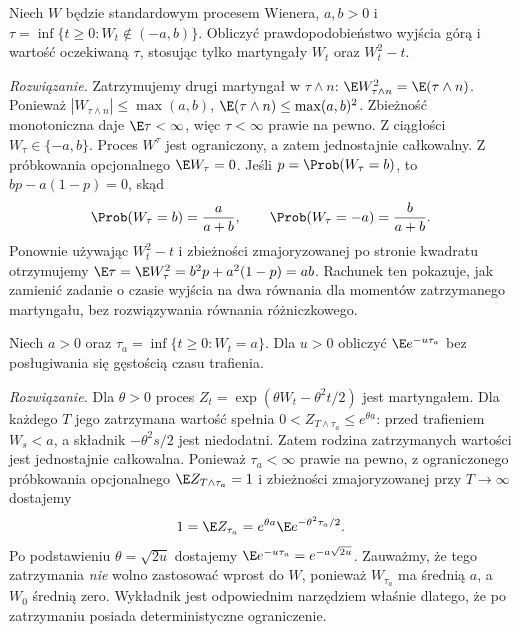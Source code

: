 \begin{zadanie}
Niech $W$ będzie standardowym procesem Wienera,
$a,b>0$ i
$\tau=\inf\{t\ge0:W_t\notin(-a,b)\}$.
Obliczyć prawdopodobieństwo wyjścia górą i wartość
oczekiwaną $\tau$, stosując tylko martyngały
$W_t$ oraz $W_t^2-t$.

\emph{Rozwiązanie.} Zatrzymujemy drugi martyngał w
$\tau\wedge n$:
$\E W_{\tau\wedge n}^2=\E(\tau\wedge n)$.
Ponieważ $|W_{\tau\wedge n}|\le\max(a,b)$,
$\E(\tau\wedge n)\le\max(a,b)^2$.
Zbieżność monotoniczna daje $\E\tau<\infty$, więc
$\tau<\infty$ prawie na pewno. Z ciągłości
$W_\tau\in\{-a,b\}$.
Proces $W^\tau$ jest ograniczony, a zatem
jednostajnie całkowalny. Z próbkowania opcjonalnego
$\E W_\tau=0$. Jeśli $p=\Prob(W_\tau=b)$, to
$bp-a(1-p)=0$, skąd
\[
\Prob(W_\tau=b)=\frac{a}{a+b},\qquad
\Prob(W_\tau=-a)=\frac{b}{a+b}.
\]
Ponownie używając $W_t^2-t$ i zbieżności zmajoryzowanej
po stronie kwadratu otrzymujemy
$\E\tau=\E W_\tau^2=b^2p+a^2(1-p)=ab$.
Rachunek ten pokazuje, jak zamienić zadanie o czasie
wyjścia na dwa równania dla momentów zatrzymanego
martyngału, bez rozwiązywania równania różniczkowego.
\end{zadanie}

\begin{zadanie}
Niech $a>0$ oraz
$\tau_a=\inf\{t\ge0:W_t=a\}$. Dla $u>0$
obliczyć $\E e^{-u\tau_a}$ bez posługiwania się
gęstością czasu trafienia.

\emph{Rozwiązanie.} Dla $\theta>0$ proces
$Z_t=\exp(\theta W_t-\theta^2t/2)$ jest
martyngałem. Dla każdego $T$ jego zatrzymana
wartość spełnia $0<Z_{T\wedge\tau_a}\le e^{\theta a}$:
przed trafieniem $W_s<a$, a składnik
$-\theta^2s/2$ jest niedodatni. Zatem rodzina
zatrzymanych wartości jest jednostajnie całkowalna.
Ponieważ $\tau_a<\infty$ prawie na pewno,
z ograniczonego próbkowania opcjonalnego
$\E Z_{T\wedge\tau_a}=1$ i zbieżności zmajoryzowanej
przy $T\to\infty$ dostajemy
\[
1=\E Z_{\tau_a}
=e^{\theta a}\E e^{-\theta^2\tau_a/2}.
\]
Po podstawieniu $\theta=\sqrt{2u}$ dostajemy
$\E e^{-u\tau_a}=e^{-a\sqrt{2u}}$.
Zauważmy, że tego zatrzymania \emph{nie} wolno
zastosować wprost do $W$, ponieważ $W_{\tau_a}$
ma średnią $a$, a $W_0$ średnią zero. Wykładnik
jest odpowiednim narzędziem właśnie dlatego, że
po zatrzymaniu posiada deterministyczne ograniczenie.
\end{zadanie}


